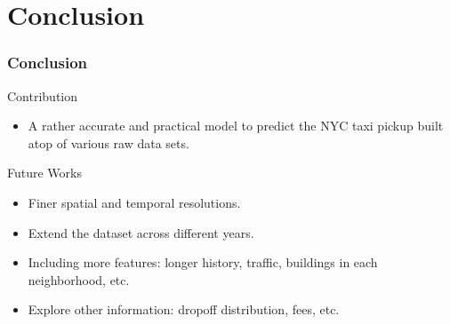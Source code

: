 \documentclass{beamer}
\begin{document}
\section[Conclusion]{Conclusion}
\begin{frame}
  \frametitle{Conclusion}
  \begin{block}{Contribution}
    \begin{itemize}
      \item A rather accurate and practical model to predict the NYC taxi pickup
      built atop of various raw data sets.
    \end{itemize}
  \end{block}
  \begin{block}{Future Works}
    \begin{itemize}
      \item Finer spatial and temporal resolutions.
      \item Extend the dataset across different years.
      \item Including more features: longer history, traffic, buildings in each
      neighborhood, etc.
      \item Explore other information: dropoff distribution, fees, etc.
    \end{itemize}
  \end{block}
\end{frame}

\end{document}
